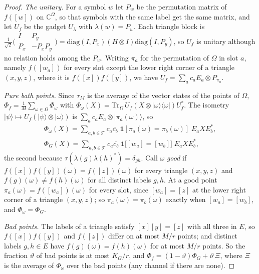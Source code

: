 \begin{proof}
\emph{The unitary.} For a symbol $w$ let $P_w$ be the permutation matrix of $f([w])$ on $\mathbb C^\Omega$, so that symbols with the same label get the
same matrix, and let $U_f$ be the gadget $U_\lambda$ with $\lambda(w)=P_w$. Each triangle block is
$\frac1{\sqrt2}\bigl(\begin{smallmatrix}I&P_y\\P_x&-P_xP_y\end{smallmatrix}\bigr)=\mathrm{diag}(I,P_x)(H\otimes I)\mathrm{diag}(I,P_y)$, so $U_f$ is unitary
although no relation holds among the $P_w$. Writing $\pi_a$ for the permutation of $\Omega$ in slot $a$, namely $f([w_a])$ for every slot except the
lower right corner of a triangle $(x,y,z)$, where it is $f([x])f([y])$, we have $U_f=\sum_ac_aE_a\otimes P_{\pi_a}$.

\emph{Pure bath points.} Since $\tau_M$ is the average of the vector states of the points of $\Omega$, $\Phi_f=\frac1M\sum_{\omega\in\Omega}\Phi_\omega$ with
$\Phi_\omega(X)=\mathrm{Tr}_\Omega\,U_f(X\otimes|\omega\rangle\langle\omega|)U_f^*$. The isometry $|\psi\rangle\mapsto U_f(|\psi\rangle\otimes|\omega\rangle)$ is
$\sum_ac_aE_a\otimes|\pi_a(\omega)\rangle$, so
\begin{gather*}
\Phi_\omega(X)=\sum_{a,b\in\mathcal T}c_a\overline{c_b}\;\mathbf 1[\pi_a(\omega)=\pi_b(\omega)]\;E_aXE_b^*,\\
\Phi_G(X)=\sum_{a,b\in\mathcal T}c_a\overline{c_b}\;\mathbf 1\bigl[[w_a]=[w_b]\bigr]\;E_aXE_b^*,
\end{gather*}
the second because $\tau(\lambda(g)\lambda(h)^*)=\delta_{gh}$. Call $\omega$ \emph{good} if $f([x])f([y])(\omega)=f([z])(\omega)$ for every triangle
$(x,y,z)$ and $f(g)(\omega)\ne f(h)(\omega)$ for all distinct labels $g,h$. At a good point $\pi_a(\omega)=f([w_a])(\omega)$ for every slot, since
$[w_a]=[z]$ at the lower right corner of a triangle $(x,y,z)$; so $\pi_a(\omega)=\pi_b(\omega)$ exactly when $[w_a]=[w_b]$, and $\Phi_\omega=\Phi_G$.

\emph{Bad points.} The labels of a triangle satisfy $[x][y]=[z]$ with all three in $E$, so $f([x])f([y])$ and $f([z])$ differ on at most $M/r$ points;
and distinct labels $g,h\in E$ have $f(g)(\omega)=f(h)(\omega)$ for at most $M/r$ points. So the fraction $\vartheta$ of bad points is at most $K_G/r$,
and $\Phi_f=(1-\vartheta)\Phi_G+\vartheta\,\Xi$, where $\Xi$ is the average of $\Phi_\omega$ over the bad points (any channel if there are none).


\end{proof}
